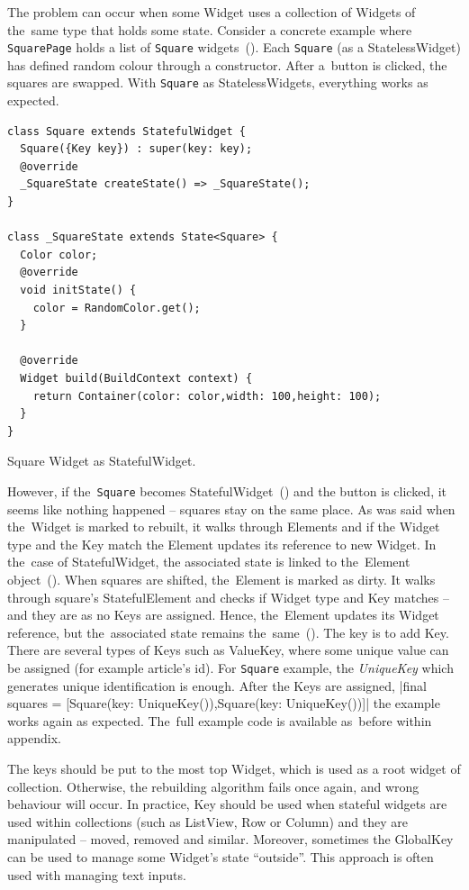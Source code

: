 The problem can occur when some Widget uses a collection of Widgets of the~same type that holds some state.  Consider a concrete example where \verb|SquarePage| holds a list of \verb|Square| widgets~(). Each \verb|Square| (as a StatelessWidget) has defined random colour through a constructor. After a~button is clicked, the squares are swapped. With \verb|Square| as StatelessWidgets, everything works as expected. 

\begin{listing}[ht]
\begin{verbatim}
class Square extends StatefulWidget {
  Square({Key key}) : super(key: key);
  @override
  _SquareState createState() => _SquareState();
}

class _SquareState extends State<Square> {
  Color color;
  @override
  void initState() {
    color = RandomColor.get();
  }

  @override
  Widget build(BuildContext context) {
    return Container(color: color,width: 100,height: 100);
  }
}
\end{verbatim}
\caption{Square Widget as StatefulWidget.}
\label{listing:keys_square_stateful}
\end{listing}

However, if the~\verb|Square| becomes StatefulWidget~() and the button is clicked, it seems like nothing happened -- squares stay on the same place. As was said when the~Widget is marked to rebuilt, it walks through Elements and if the Widget type and the Key match the Element updates its reference to new Widget. In the~case of StatefulWidget, the associated state is linked to the~Element object~(). When squares are shifted, the~Element is marked as dirty. It walks through square's StatefulElement and checks if Widget type and Key matches -- and they are as no Keys are assigned. Hence, the~Element updates its Widget reference, but the~associated state remains the~same~(). 
The key is to add Key. There are several types of Keys such as ValueKey, where some unique value can be assigned (for example article's id). For \verb|Square| example, the \textit{UniqueKey} which generates unique identification is enough.  After the Keys are assigned, |final squares = [Square(key: UniqueKey()),Square(key: UniqueKey())]| the example works again as expected. The~full example code is available as~before within appendix.

The keys should be put to the most top Widget, which is used as a root widget of collection. Otherwise, the rebuilding algorithm fails once again, and wrong behaviour will occur. In practice, Key should be used when stateful widgets are used within collections (such as ListView, Row or Column) and they are manipulated -- moved, removed and similar.  Moreover, sometimes the GlobalKey can be used to manage some Widget's state ``outside''. This approach is often used with managing text inputs. 
